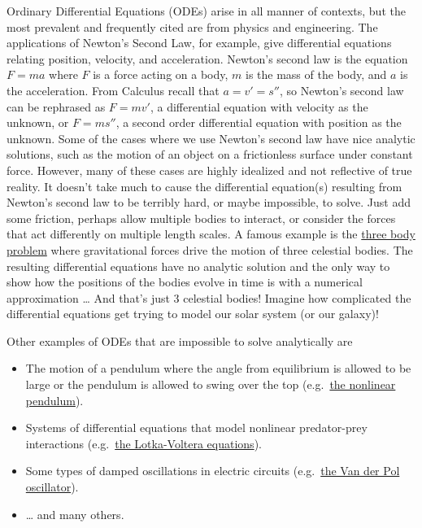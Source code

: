 \documentclass[
]{book}
\providecommand{\tightlist}{%
  \setlength{\itemsep}{0pt}\setlength{\parskip}{0pt}}
\theoremstyle{definition}
\theoremstyle{definition}
\theoremstyle{definition}
\theoremstyle{remark}
\begin{document}
Ordinary Differential Equations (ODEs) arise in all manner of contexts, but the most prevalent and frequently cited are from physics and engineering. The applications of Newton's Second Law, for example, give differential equations relating position, velocity, and acceleration. Newton's second law is the equation \(F = ma\) where \(F\) is a force acting on a body, \(m\) is the mass of the body, and \(a\) is the acceleration. From Calculus recall that \(a = v' = s''\), so Newton's second law can be rephrased as \(F = mv'\), a differential equation with velocity as the unknown, or \(F = ms''\), a second order differential equation with position as the unknown. Some of the cases where we use Newton's second law have nice analytic solutions, such as the motion of an object on a frictionless surface under constant force. However, many of these cases are highly idealized and not reflective of true reality. It doesn't take much to cause the differential equation(s) resulting from Newton's second law to be terribly hard, or maybe impossible, to solve. Just add some friction, perhaps allow multiple bodies to interact, or consider the forces that act differently on multiple length scales. A famous example is the \href{https://en.wikipedia.org/wiki/Three-body_problem}{three body problem} where gravitational forces drive the motion of three celestial bodies. The resulting differential equations have no analytic solution and the only way to show how the positions of the bodies evolve in time is with a numerical approximation \ldots{} And that's just 3 celestial bodies! Imagine how complicated the differential equations get trying to model our solar system (or our galaxy)!

Other examples of ODEs that are impossible to solve analytically are

\begin{itemize}
\tightlist
\item
  The motion of a pendulum where the angle from equilibrium is allowed to be large or the pendulum is allowed to swing over the top (e.g.~\href{https://en.wikipedia.org/wiki/Pendulum_(mathematics)\#Simple_gravity_pendulum}{the nonlinear pendulum}).
\item
  Systems of differential equations that model nonlinear predator-prey interactions (e.g.~\href{https://en.wikipedia.org/wiki/Lotka\%E2\%80\%93Volterra_equations}{the Lotka-Voltera equations}).
\item
  Some types of damped oscillations in electric circuits (e.g.~\href{https://en.wikipedia.org/wiki/Van_der_Pol_oscillator}{the Van der Pol oscillator}).
\item
  \ldots{} and many others.
\end{itemize}
\end{document}
